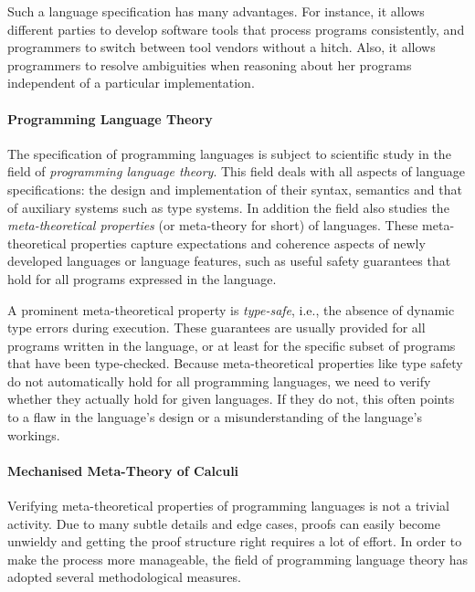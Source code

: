 {%

Such a language specification has many advantages. For instance, it allows
different parties to develop software tools that process programs consistently,
and programmers to switch between tool vendors without a hitch.
Also, it allows programmers to resolve ambiguities when reasoning about her
programs independent of a particular implementation. 


\paragraph{Programming Language Theory}
The specification of programming languages is subject to scientific study in
the field of \emph{programming language theory}. This field deals with all
aspects of language specifications: the design and implementation of their
syntax, semantics and that of auxiliary systems such as type systems. In addition
the field also studies the \emph{meta-theoretical properties} (or meta-theory for short)
of languages. These meta-theoretical properties capture expectations and coherence
aspects of newly developed languages or language features, such as 
useful safety guarantees that 
hold for all programs expressed in the language. 

A prominent meta-theoretical property is \emph{type-safe}, i.e., the absence of
dynamic type errors during execution. These guarantees are usually provided for
all programs written in the language, or at least for the specific subset of
programs that have been type-checked. Because meta-theoretical properties like
type safety do not automatically hold for all programming languages, we need to
verify whether they actually hold for given languages. If they do not, this
often points to a flaw in the language's design or a misunderstanding of the
language's workings.

\paragraph{Mechanised Meta-Theory of Calculi}
Verifying meta-theoretical properties of programming languages is not a trivial
activity. Due to many subtle details and edge cases, proofs can easily become
unwieldy and getting the proof structure right requires a lot of effort. In
order to make the process more manageable, the field of programming language
theory has adopted several methodological measures.

}
